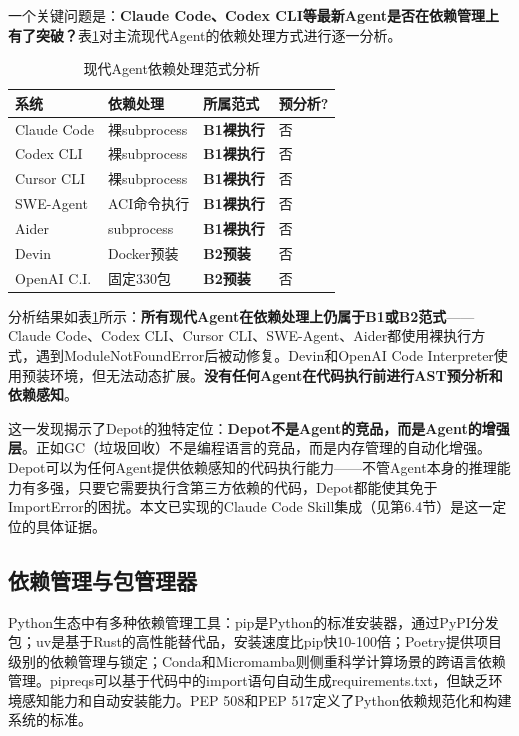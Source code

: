 \documentclass[10pt]{ctexart}
\begin{document}
一个关键问题是：\textbf{Claude Code、Codex CLI等最新Agent是否在依赖管理上有了突破？}表\ref{tab:modern}对主流现代Agent的依赖处理方式进行逐一分析。

\begin{table}[H]
\centering
\caption{现代Agent依赖处理范式分析}
\label{tab:modern}
\small
\begin{tabular}{@{}p{2.0cm} p{2.4cm} p{1.8cm} p{1.8cm}@{}}
\toprule
系统 & 依赖处理 & 所属范式 & 预分析? \\
\midrule
Claude Code & 裸subprocess & \textbf{B1裸执行} & 否 \\
Codex CLI & 裸subprocess & \textbf{B1裸执行} & 否 \\
Cursor CLI & 裸subprocess & \textbf{B1裸执行} & 否 \\
SWE-Agent & ACI命令执行 & \textbf{B1裸执行} & 否 \\
Aider & subprocess & \textbf{B1裸执行} & 否 \\
Devin & Docker预装 & \textbf{B2预装} & 否 \\
OpenAI C.I. & 固定330包 & \textbf{B2预装} & 否 \\

\bottomrule
\end{tabular}
\end{table}

分析结果如表\ref{tab:modern}所示：\textbf{所有现代Agent在依赖处理上仍属于B1或B2范式}——Claude Code、Codex CLI、Cursor CLI、SWE-Agent\cite{jimenez2024sweagent}、Aider\cite{guo2024aider}都使用裸执行方式，遇到ModuleNotFoundError后被动修复。Devin\cite{cognition2024devin}和OpenAI Code Interpreter\cite{openai2023code}使用预装环境，但无法动态扩展。\textbf{没有任何Agent在代码执行前进行AST预分析和依赖感知}。

这一发现揭示了Depot的独特定位：\textbf{Depot不是Agent的竞品，而是Agent的增强层}。正如GC（垃圾回收）不是编程语言的竞品，而是内存管理的自动化增强。Depot可以为任何Agent提供依赖感知的代码执行能力——不管Agent本身的推理能力有多强，只要它需要执行含第三方依赖的代码，Depot都能使其免于ImportError的困扰。本文已实现的Claude Code Skill集成（见第6.4节）是这一定位的具体证据。

\subsection{依赖管理与包管理器}
Python生态中有多种依赖管理工具：pip\cite{pip2024}是Python的标准安装器，通过PyPI\cite{pypi2024}分发包；uv\cite{uv2024}是基于Rust的高性能替代品，安装速度比pip快10-100倍；Poetry\cite{poetry2024}提供项目级别的依赖管理与锁定；Conda和Micromamba则侧重科学计算场景的跨语言依赖管理。pipreqs可以基于代码中的import语句自动生成requirements.txt，但缺乏环境感知能力和自动安装能力。PEP 508\cite{pep508}和PEP 517\cite{pep517}定义了Python依赖规范化和构建系统的标准。
\end{document}
